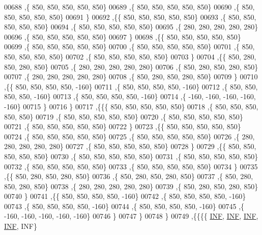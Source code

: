 \begin{DoxyCode}
00688    ,\{   850,   850,   850,   850,   850\}
00689    ,\{   850,   850,   850,   850,   850\}
00690    ,\{   850,   850,   850,   850,   850\}
00691    \}
00692   ,\{\{   850,   850,   850,   850,   850\}
00693    ,\{   850,   850,   850,   850,   850\}
00694    ,\{   850,   850,   850,   850,   850\}
00695    ,\{   280,   280,   280,   280,   280\}
00696    ,\{   850,   850,   850,   850,   850\}
00697    \}
00698   ,\{\{   850,   850,   850,   850,   850\}
00699    ,\{   850,   850,   850,   850,   850\}
00700    ,\{   850,   850,   850,   850,   850\}
00701    ,\{   850,   850,   850,   850,   850\}
00702    ,\{   850,   850,   850,   850,   850\}
00703    \}
00704   ,\{\{   850,   280,   850,   280,   850\}
00705    ,\{   280,   280,   280,   280,   280\}
00706    ,\{   850,   280,   850,   280,   850\}
00707    ,\{   280,   280,   280,   280,   280\}
00708    ,\{   850,   280,   850,   280,   850\}
00709    \}
00710   ,\{\{   850,   850,   850,   850,  -160\}
00711    ,\{   850,   850,   850,   850,  -160\}
00712    ,\{   850,   850,   850,   850,  -160\}
00713    ,\{   850,   850,   850,   850,  -160\}
00714    ,\{  -160,  -160,  -160,  -160,  -160\}
00715    \}
00716   \}
00717  ,\{\{\{   850,   850,   850,   850,   850\}
00718    ,\{   850,   850,   850,   850,   850\}
00719    ,\{   850,   850,   850,   850,   850\}
00720    ,\{   850,   850,   850,   850,   850\}
00721    ,\{   850,   850,   850,   850,   850\}
00722    \}
00723   ,\{\{   850,   850,   850,   850,   850\}
00724    ,\{   850,   850,   850,   850,   850\}
00725    ,\{   850,   850,   850,   850,   850\}
00726    ,\{   280,   280,   280,   280,   280\}
00727    ,\{   850,   850,   850,   850,   850\}
00728    \}
00729   ,\{\{   850,   850,   850,   850,   850\}
00730    ,\{   850,   850,   850,   850,   850\}
00731    ,\{   850,   850,   850,   850,   850\}
00732    ,\{   850,   850,   850,   850,   850\}
00733    ,\{   850,   850,   850,   850,   850\}
00734    \}
00735   ,\{\{   850,   280,   850,   280,   850\}
00736    ,\{   850,   280,   850,   280,   850\}
00737    ,\{   850,   280,   850,   280,   850\}
00738    ,\{   280,   280,   280,   280,   280\}
00739    ,\{   850,   280,   850,   280,   850\}
00740    \}
00741   ,\{\{   850,   850,   850,   850,  -160\}
00742    ,\{   850,   850,   850,   850,  -160\}
00743    ,\{   850,   850,   850,   850,  -160\}
00744    ,\{   850,   850,   850,   850,  -160\}
00745    ,\{  -160,  -160,  -160,  -160,  -160\}
00746    \}
00747   \}
00748  \}
00749 ,\{\{\{\{   \hyperlink{energy__const_8h_a12c2040f25d8e3a7b9e1c2024c618cb6}{INF},   \hyperlink{energy__const_8h_a12c2040f25d8e3a7b9e1c2024c618cb6}{INF},   \hyperlink{energy__const_8h_a12c2040f25d8e3a7b9e1c2024c618cb6}{INF},   \hyperlink{energy__const_8h_a12c2040f25d8e3a7b9e1c2024c618cb6}{INF},   INF\}

\end{DoxyCode}
